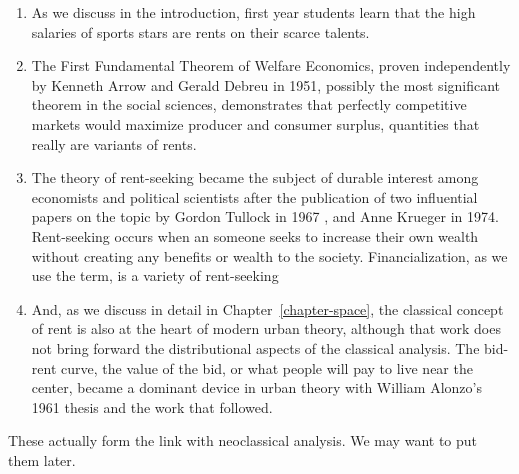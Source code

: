 \begin{enumerate}

    \item As we discuss in the introduction, first year students learn that the high salaries of sports stars are rents on their scarce talents. 

    \item The First Fundamental Theorem of Welfare Economics, proven independently by Kenneth Arrow \cite{arrowExtensionBasicTheorems1951}and  Gerald Debreu \cite{debreuCoefficientResourceUtilization1951}  in 1951, possibly the most significant theorem in the social sciences, demonstrates that perfectly competitive markets would maximize producer and consumer surplus, quantities that really are variants of rents.

    \item The theory of \gls{rent-seeking}  became the subject of durable interest among economists and political scientists after the publication of two influential papers on the topic by Gordon Tullock in 1967 \cite{tullockWelfareCostsTariffs1967}, and Anne Krueger \cite{kruegerPoliticalEconomyRentSeeking1974} in 1974. Rent-seeking occurs when an someone seeks to increase their own wealth without creating any benefits or wealth to the society. Financialization, as we use the term, is a variety of rent-seeking
    
    \item And, as we discuss in detail in Chapter~\ref{chapter-space}, the classical concept of rent is also at the heart of modern urban theory, although that work does not bring forward the distributional aspects of the classical analysis. The \gls{bid-rent curve}, the value of the bid, or what people will pay to live near the center, became a dominant device  in urban theory with William Alonzo's 1961 thesis \cite{alonzoTheoryUrbanLand1960} and the work that followed. %
\end{enumerate}

These actually form the link with neoclassical analysis. We may want to put them later.


